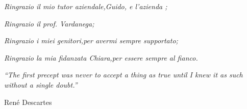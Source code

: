 \setlength{}
\setlength\epigraphrule{0pt}

\begin{flushright}
   \large{\textit{Ringrazio il mio tutor aziendale,\linebreak Guido, e l'azienda \nomeAzienda{};}}
\end{flushright}

\begin{flushright}
   \large{\textit{Ringrazio il prof. Vardanega;}}
\end{flushright}

\begin{flushright}
   \large{\textit{Ringrazio i miei genitori,\linebreak per avermi sempre supportato;}}
\end{flushright}

\begin{flushright}
   \large{\textit{Ringrazio la mia fidanzata Chiara,\linebreak per essere sempre al fianco.}}
\end{flushright}

\vspace*{\fill}

\epigraph{\textit{``The first precept was never to accept a thing as true until I knew it as such without a single doubt.''}}{René Descartes}
